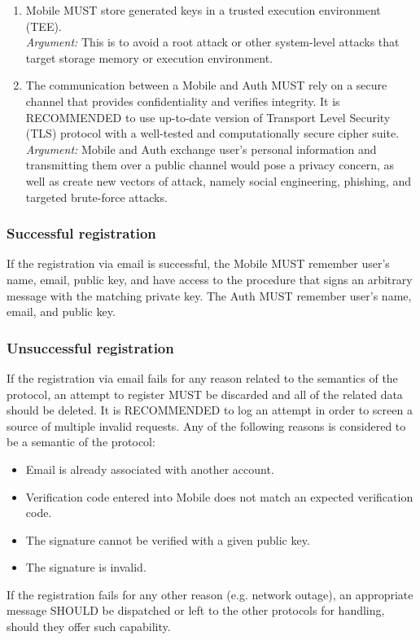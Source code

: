 \begin{enumerate}
                \item Mobile MUST store generated keys in a trusted execution environment (TEE).\\        
                \textit{Argument:} This is to avoid a root attack or other system-level attacks that target storage 
                                memory or execution environment.

                \item The communication between a Mobile and Auth MUST rely on a secure channel that provides 
                    confidentiality and verifies integrity. It is RECOMMENDED to use up-to-date version of 
                    Transport Level Security (TLS) protocol with a well-tested and computationally secure 
                    cipher suite.\\      
                \textit{Argument:} Mobile and Auth exchange user's personal information and transmitting them over a 
                                public channel would pose a privacy concern, as well as create new vectors of attack, 
                                namely social engineering, phishing, and targeted brute-force attacks.
            \end{enumerate}
        
        \subsubsection{Successful registration}
        If the registration via email is successful, the Mobile MUST remember user's name, email, public key, and 
        have access to the procedure that signs an arbitrary message with the matching private key. The Auth MUST 
        remember user's name, email, and public key.

        \subsubsection{Unsuccessful registration}
        If the registration via email fails for any reason related to the semantics of the protocol, an attempt to
        register MUST be discarded and all of the related data should be deleted. It is RECOMMENDED to log an attempt
        in order to screen a source of multiple invalid requests. Any of the following reasons is considered to be
        a semantic of the protocol:
            \begin{itemize}
                \item Email is already associated with another account.
                \item Verification code entered into Mobile does not match an expected verification code.
                \item The signature cannot be verified with a given public key.
                \item The signature is invalid.
            \end{itemize}
        If the registration fails for any other reason (e.g. network outage), an appropriate message SHOULD be
        dispatched or left to the other protocols for handling, should they offer such capability.

